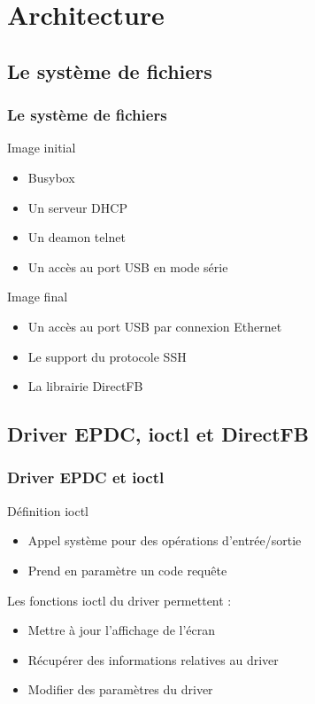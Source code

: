 \section{Architecture}
\subsection{Le système de fichiers}
\begin{frame}
\frametitle{Le système de fichiers}

\begin{block}{Image initial}
\begin{itemize}
\item Busybox
\item Un serveur DHCP
\item Un deamon telnet
\item Un accès au port USB en mode série 
\end{itemize}
\end{block}

\begin{block}{Image final}
\begin{itemize}
\item Un accès au port USB par connexion Ethernet
\item Le support du protocole SSH
\item La librairie DirectFB
\end{itemize}
\end{block}

\end{frame}

\subsection{Driver EPDC, ioctl et DirectFB}

\begin{frame}
\frametitle{Driver EPDC et ioctl}

\begin{block}{Définition ioctl}
\begin{itemize}
\item Appel système pour des opérations d'entrée/sortie
\item Prend en paramètre un code requête
\end{itemize}
\end{block}
\begin{block}{Les fonctions ioctl du driver permettent :}
\begin{itemize}
\item Mettre à jour l'affichage de l'écran
\item Récupérer des informations relatives au driver
\item Modifier des paramètres du driver
\end{itemize}
\end{block}

\end{frame}

